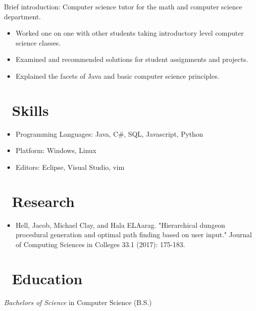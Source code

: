 \documentclass{resume}
\begin{document}

Brief introduction: Computer science tutor for the math and computer science department.
\begin{itemize}
  \item Worked one on one with other students taking introductory level computer science classes.
  \item Examined and recommended solutions for student assignments and projects.
  \item Explained the facets of Java and basic computer science principles.
\end{itemize}

\section{\faCogs\ Skills}
\begin{itemize}[parsep=0.5ex]
  \item Programming Languages: Java, C\#, SQL, Javascript, Python
  \item Platform: Windows, Linux
  \item Editors: Eclipse, Visual Studio, vim
\end{itemize}

\section{\faFlask\ Research}
\begin{itemize}[parsep=0.5ex]
\item Hell, Jacob, Michael Clay, and Hala ELAarag. "Hierarchical dungeon procedural generation and optimal path finding based on user input." Journal of Computing Sciences in Colleges 33.1 (2017): 175-183.
\end{itemize}
\section{\faGraduationCap\ Education}
\textit{Bachelors of Science} in Computer Science (B.S.)
\end{document}
